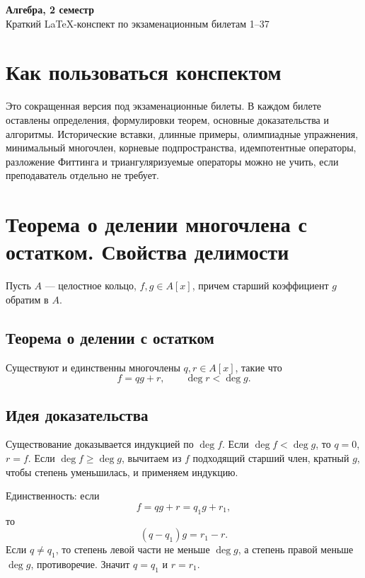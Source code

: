 \documentclass[12pt,a4paper]{article}
\begin{document}
\begin{center}
    {\Large \textbf{Алгебра, 2 семестр}}\\[4pt]
    {\large Краткий LaTeX-конспект по экзаменационным билетам 1--37}
\end{center}

\tableofcontents
\newpage

\section*{Как пользоваться конспектом}

Это сокращенная версия под экзаменационные билеты. В каждом билете оставлены определения, формулировки теорем, основные доказательства и алгоритмы. Исторические вставки, длинные примеры, олимпиадные упражнения, минимальный многочлен, корневые подпространства, идемпотентные операторы, разложение Фиттинга и триангуляризуемые операторы можно не учить, если преподаватель отдельно не требует.

\section{Теорема о делении многочлена с остатком. Свойства делимости}

Пусть $A$ --- целостное кольцо, $f,g\in A[x]$, причем старший коэффициент $g$ обратим в $A$.

\subsection*{Теорема о делении с остатком}

Существуют и единственны многочлены $q,r\in A[x]$, такие что
\[
    f=qg+r,\qquad \deg r<\deg g.
\]

\subsection*{Идея доказательства}

Существование доказывается индукцией по $\deg f$. Если $\deg f<\deg g$, то $q=0$, $r=f$. Если $\deg f\ge \deg g$, вычитаем из $f$ подходящий старший член, кратный $g$, чтобы степень уменьшилась, и применяем индукцию.

Единственность: если
\[
    f=qg+r=q_1g+r_1,
\]
то
\[
    (q-q_1)g=r_1-r.
\]
Если $q\ne q_1$, то степень левой части не меньше $\deg g$, а степень правой меньше $\deg g$, противоречие. Значит $q=q_1$ и $r=r_1$.
\end{document}
